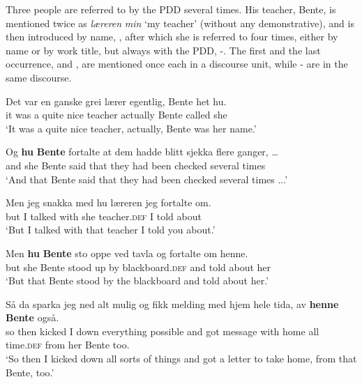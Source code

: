\documentclass[output=paper,colorlinks,citecolor=brown]{langscibook}
\begin{document}
Three people are referred to by the PDD several times. His teacher, Bente, is mentioned twice as \textit{læreren} \textit{min} ‘my teacher’ (without any demonstrative), and is then introduced by name, , after which she is referred to four times, either by name or by work title, but always with the PDD, -. The first and the last occurrence,  and , are mentioned once each in a discourse unit, while - are in the same discourse.

\ea\label{ex:johannessen:15}
 \gll Det var en ganske grei lærer egentlig, Bente het hu.\\
     it was a quite nice teacher actually Bente called she\\
\glt ‘It was a quite nice teacher, actually, Bente was her name.’ \citep[53, middle]{Rishoi2014}
\z

\ea\label{ex:johannessen:16}
 \gll Og \textbf{hu} \textbf{Bente} fortalte at dem hadde blitt sjekka flere ganger, …\\
     and she Bente said that they had been checked several times\\
\glt ‘And that Bente said that they had been checked several times ...’ \citep[54, top]{Rishoi2014}
\z

\ea\label{ex:johannessen:17}
 \gll Men jeg snakka med hu læreren jeg fortalte om.\\
     but I talked with she teacher.\textsc{def} I told about \\
\glt ‘But I talked with that teacher I told you about.’ \citep[57, line 2]{Rishoi2014}
\z

\ea\label{ex:johannessen:18}
 \gll Men \textbf{hu} \textbf{Bente} sto oppe ved tavla og fortalte om henne.\\
     but she Bente stood up by blackboard.\textsc{def} and told about her \\
\glt ‘But that Bente stood by the blackboard and told about her.’ \citep[57, line 5]{Rishoi2014}
\z

\ea\label{ex:johannessen:19}
 \gll Så da sparka jeg ned alt mulig og fikk melding med hjem hele tida, av \textbf{henne} \textbf{Bente} også.\\
     so then kicked I down everything possible and got message with home all time.\textsc{def} from her Bente too. \\
\glt ‘So then I kicked down all sorts of things and got a letter to take home, from that Bente, too.’ \citep[61, bottom]{Rishoi2014}
\z
\end{document}
